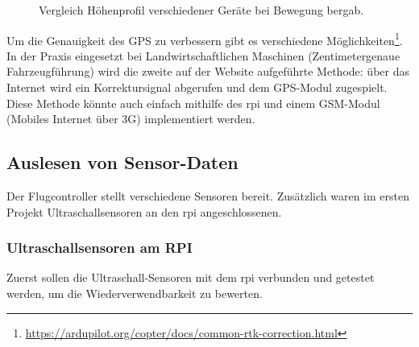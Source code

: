 \begin{figure}[h!]
    \centering
            
    \caption{Vergleich Höhenprofil verschiedener Geräte bei Bewegung bergab.}
    \label{fig:bench_gps_elevation}
\end{figure}

Um die Genauigkeit des GPS zu verbessern gibt es verschiedene Möglichkeiten\footnote{\url{https://ardupilot.org/copter/docs/common-rtk-correction.html}}. In der Praxis eingesetzt bei Landwirtschaftlichen Maschinen (Zentimetergenaue Fahrzeugführung) wird die zweite auf der Website aufgeführte Methode: über das Internet wird ein Korrektursignal abgerufen und dem GPS-Modul zugespielt. Diese Methode könnte auch einfach mithilfe des \gls{rpi} und einem GSM-Modul (Mobiles Internet über 3G) implementiert werden.

\subsection{Auslesen von Sensor-Daten}
Der Flugcontroller stellt verschiedene Sensoren bereit. Zusätzlich waren im ersten Projekt Ultraschallsensoren an den \gls{rpi} angeschlossenen. 

\subsubsection{Ultraschallsensoren am RPI}
Zuerst sollen die Ultraschall-Sensoren mit dem \gls{rpi} verbunden und getestet werden, um die Wiederverwendbarkeit zu bewerten. %

